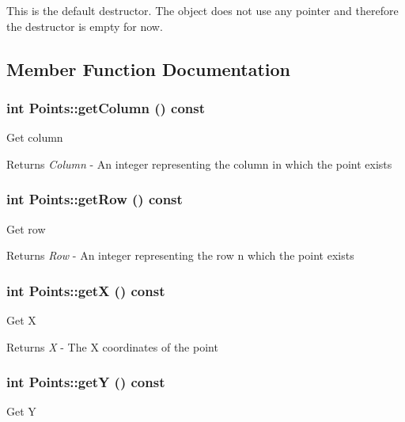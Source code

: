 This is the default destructor. The object does not use any pointer and therefore the destructor is empty for now. 

\subsection{Member Function Documentation}
\hypertarget{classPoints_aa55ab8e763830977bf1754ec4eed4a04}{
\subsubsection[{getColumn}]{\setlength{\rightskip}{0pt plus 5cm}int Points::getColumn () const}}
\label{classPoints_aa55ab8e763830977bf1754ec4eed4a04}
Get column

\begin{DoxyReturn}{Returns}
{\itshape Column\/} -\/ An integer representing the column in which the point exists 
\end{DoxyReturn}
\hypertarget{classPoints_ab02d1378e304aa93a8295d91760edfd5}{
\subsubsection[{getRow}]{\setlength{\rightskip}{0pt plus 5cm}int Points::getRow () const}}
\label{classPoints_ab02d1378e304aa93a8295d91760edfd5}
Get row

\begin{DoxyReturn}{Returns}
{\itshape Row\/} -\/ An integer representing the row n which the point exists 
\end{DoxyReturn}
\hypertarget{classPoints_a1e456e00d343c7e514d3d3560ba64d87}{
\subsubsection[{getX}]{\setlength{\rightskip}{0pt plus 5cm}int Points::getX () const}}
\label{classPoints_a1e456e00d343c7e514d3d3560ba64d87}
Get X

\begin{DoxyReturn}{Returns}
{\itshape X\/} -\/ The X coordinates of the point 
\end{DoxyReturn}
\hypertarget{classPoints_aadcbf3fa0d8833e9465138e368ba8498}{
\subsubsection[{getY}]{\setlength{\rightskip}{0pt plus 5cm}int Points::getY () const}}
\label{classPoints_aadcbf3fa0d8833e9465138e368ba8498}
Get Y

